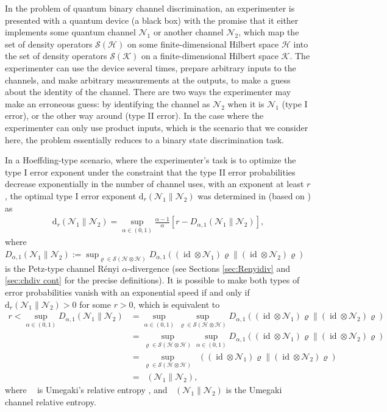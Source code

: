 \documentclass[unsortedaddress,superscriptaddress,pra,notitlepage]{revtex4}
\def\N{\mathcal{N}}
\def\S{{\mathcal S}}
\def\rho{\varrho}
\def\hil{{\mathcal H}}
\def\kil{{\mathcal K}}
\def\d{\mathrm{d}}
\DeclareMathOperator{\id}{id}
\DeclareMathOperator{\DU}{\mathit{D}^{Um}}
\begin{document}
In the problem of quantum binary channel discrimination, an experimenter is presented with a quantum device (a black box) with the promise that it either implements some quantum channel $\N_1$ or another channel $\N_2$, which map
the set of density operators $\S(\hil)$ on some finite-dimensional Hilbert space $\hil$ into 
the set of density operators $\S(\kil)$ on a finite-dimensional Hilbert space $\kil$.
The experimenter can use the device several times, prepare arbitrary inputs to the channels, and make arbitrary 
measurements at the outputs, to make a guess about the identity of the channel.
There are two ways the experimenter may make an erroneous guess: by identifying the channel 
as $\N_2$ when it is $\N_1$ (type I error), or the other way around (type II error). 
In the case where the experimenter can only use product inputs, which is the scenario that we consider here, the problem essentially reduces to a 
binary state discrimination task. 

In a Hoeffding-type scenario, where the experimenter's task is to optimize
the type I error exponent under the constraint that the type II error probabilities decrease exponentially 
in the number of channel uses, with an exponent at least $r$, 
the optimal type I error exponent $\d_r(\N_1\|\N_2)$ 
was determined in 
\cite{CMW} (based on  \cite{ANSzV,Hayashicq,Nagaoka}) as
\begin{align*}
\d_r(\N_1\|\N_2)=\sup_{\alpha\in(0,1)}\frac{\alpha-1}{\alpha}\left[r-D_{\alpha,1}(\N_1\|\N_2)\right],
\end{align*}
where $D_{\alpha,1}(\N_1\|\N_2):=\sup_{\rho\in\S(\hil\otimes\hil)}D_{\alpha,1}((\id\otimes\N_1)\rho\|(\id\otimes\N_2)\rho)$ is the Petz-type channel R\'enyi $\alpha$-divergence \cite{P86,CMW} (see Sections \ref{sec:Renyidiv} and \ref{sec:chdiv cont} for the precise definitions). It is possible to make both types of error probabilities vanish with an exponential speed if and only if 
$\d_r(\N_1\|\N_2)>0$ for some $r>0$, which is equivalent to 
\begin{align*}
r
<
\sup_{\alpha\in(0,1)}D_{\alpha,1}(\N_1\|\N_2)
&=
\sup_{\alpha\in(0,1)}\sup_{\rho\in\S(\hil\otimes\hil)}D_{\alpha,1}((\id\otimes\N_1)\rho\|(\id\otimes\N_2)\rho)\\
&=
\sup_{\rho\in\S(\hil\otimes\hil)}\sup_{\alpha\in(0,1)}D_{\alpha,1}((\id\otimes\N_1)\rho\|(\id\otimes\N_2)\rho)\\
&=
\sup_{\rho\in\S(\hil\otimes\hil)}\DU((\id\otimes\N_1)\rho\|(\id\otimes\N_2)\rho)\\
&=
\DU(\N_1\|\N_2),
\end{align*}
where $\DU$ is Umegaki's relative entropy \cite{Umegaki}, and
$\DU(\N_1\|\N_2)$ is the Umegaki channel relative entropy.
\end{document}
